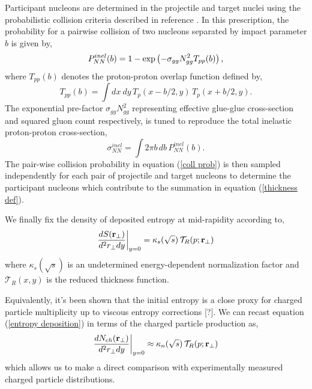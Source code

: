 \documentclass[aps,prl,reprint,amsmath,nofootinbib]{revtex4-1}
\begin{document}
Participant nucleons are determined in the projectile and target nuclei using the probabilistic collision criteria described in reference \cite{proton-proton}. In this prescription, the 
probability for a pairwise collision of two nucleons separated by impact parameter $b$ is given by,
\begin{equation}
  \label{coll prob}
  P^{inel}_{NN}(b) = 1 - \exp \left(-\sigma_{gg} N_{gg}^2 T_{pp}(b) \right), \\[1ex]
\end{equation}
where $T_{pp}(b)$ denotes the proton-proton overlap function defined by,
\begin{equation}
 T_{pp}(b) = \int dx~dy \,T_p(x-b/2,y) \,T_p(x+b/2,y).
\end{equation}
The exponential pre-factor $\sigma_{gg} N_{gg}^2$ representing effective glue-glue cross-section and squared gluon count respectively, is tuned to reproduce the total 
inelastic proton-proton cross-section,
\begin{equation}
  \sigma^{inel}_{NN} = \int 2 \pi b \,db \, P_{NN}^{inel}(b).
\end{equation}
The pair-wise collision probability in equation (\ref{coll prob}) is then sampled independently for each pair of projectile and target nucleons to determine the participant nucleons 
which contribute to the summation in equation (\ref{thickness def}).

We finally fix the density of deposited entropy at mid-rapidity according to,
\begin{equation}
 \label{entropy deposition}
 \frac{dS({\bf r}_\perp)}{d^2r_\perp dy} \biggr \rvert_{y=0} = \kappa_s(\sqrt{s})\, \mathcal{T}_R(p;{\bf r}_\perp)
\end{equation}
where $\kappa_s(\sqrt{s})$ is an undetermined energy-dependent normalization factor and $\mathcal{T}_R(x,y)$ is the reduced thickness function.

Equivalently, it's been shown that the initial entropy is a close proxy for charged particle multiplicity up to viscous entropy corrections [?]. We can 
recast equation (\ref{entropy deposition}) in terms of the charged particle production as,
\begin{equation}
 \label{particle production}
 \frac{dN_{ch}({\bf r}_\perp)}{d^2r_\perp dy} \biggr \rvert_{y=0} \approx \kappa_n(\sqrt{s})\, \mathcal{T}_R(p;{\bf r}_\perp)
\end{equation}
which allows us to make a direct comparison with experimentally measured charged particle distributions.
\end{document}
